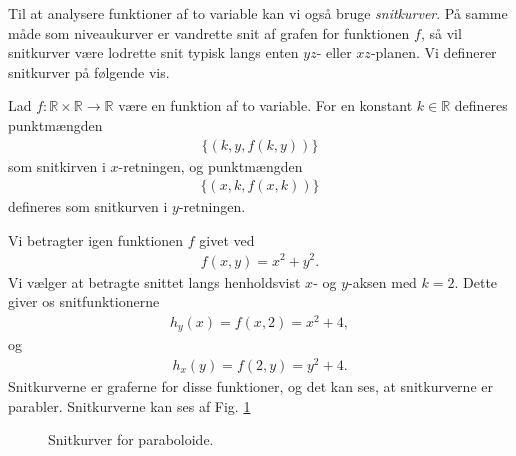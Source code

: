 Til at analysere funktioner af to variable kan vi også bruge \textit{snitkurver}. På samme måde som niveaukurver er vandrette snit af grafen for funktionen $f$, så vil snitkurver være lodrette snit typisk langs enten $yz$- eller $xz$-planen. Vi definerer snitkurver på følgende vis.
\begin{defn}[Snitkurver]
	Lad $f:\mathbb{R}\times \mathbb{R} \to \mathbb{R}$ være en funktion af to variable. For en konstant $k\in\mathbb{R}$ defineres punktmængden
	\begin{align*}
		\{(k,y,f(k,y))\}
	\end{align*}
	som snitkirven i $x$-retningen, og punktmængden
	\begin{align*}
		\{(x,k,f(x,k))\}
	\end{align*}
	defineres som snitkurven i $y$-retningen. 
\end{defn}

\begin{exa}
	Vi betragter igen funktionen $f$ givet ved
	\begin{align*}
		f(x,y) = x^2 + y^2.
	\end{align*}
	Vi vælger at betragte snittet langs  henholdsvist $x$- og $y$-aksen med $k= 2$. Dette giver os snitfunktionerne
	\begin{align*}
		h_y(x) = f(x,2) = x^2+4,
	\end{align*}
	og 
	\begin{align*}
		h_x(y) = f(2,y) = y^2+4.
	\end{align*}
	Snitkurverne er graferne for disse funktioner, og det kan ses, at snitkurverne er parabler. Snitkurverne kan ses af Fig. \ref{fig:snit}	
	\begin{figure}[H]
		\centering
		\caption{Snitkurver for paraboloide.}
		\label{fig:snit}
	\end{figure}
\end{exa}

